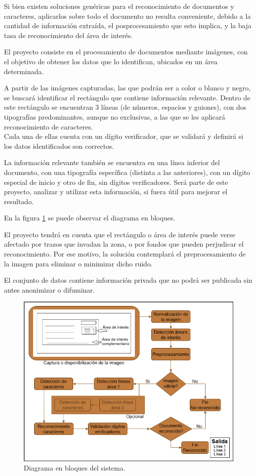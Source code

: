 \documentclass[
11pt, %
]{charter}
\begin{document}
Si bien existen soluciones genéricas para el reconocimiento de documentos y caracteres, aplicarlos sobre todo el documento no resulta conveniente, debido a la cantidad de información extraída, el posprocesamiento que esto implica, y la baja tasa de reconocimiento del área de interés.

El proyecto consiste en el procesamiento de documentos mediante imágenes, con el objetivo de obtener los datos que lo identifican, ubicados en un área determinada. 

A partir de las imágenes capturadas, las que podrán ser a color o blanco y negro, se buscará identificar el rectángulo que contiene información relevante. Dentro de este rectángulo se encuentran 3 líneas (de números, espacios y guiones), con dos tipografías predominantes, aunque no exclusivas, a las que se les aplicará reconocimiento de caracteres.\\
Cada una de ellas cuenta con un dígito verificador, que se validará y definirá si los datos identificados son correctos.

La información relevante también se encuentra en una línea inferior del documento, con una tipografía específica (distinta a las anteriores), con un dígito especial de inicio y otro de fin, sin dígitos verificadores.
Será parte de este proyecto, analizar y utilizar esta información, si fuera útil para mejorar el resultado.

En la figura \ref{fig:diagBloques} se puede observar el diagrama en bloques.

El proyecto tendrá en cuenta que el rectángulo o área de interés puede verse afectado por trazos que invadan la zona, o por fondos que pueden perjudicar el reconocimiento. Por ese motivo, la solución contemplará el preprocesamiento de la imagen para eliminar o minimizar dicho ruido.

El conjunto de datos contiene información privada que no podrá ser publicada sin antes anonimizar o difuminar.

\begin{figure}[htpb]
\centering 
\includegraphics[width=.94\textwidth]{./Figuras/diagBloques.png}
\caption{Diagrama en bloques del sistema.}
\label{fig:diagBloques}
\end{figure}
\end{document}
